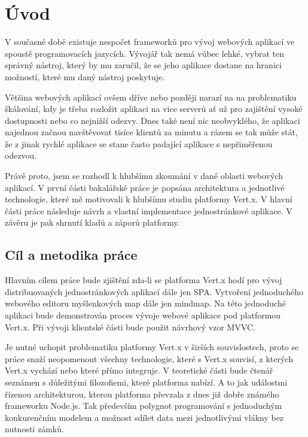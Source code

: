 

\chapter{Úvod}

V současné době existuje nespočet frameworků pro vývoj webových aplikací ve spoustě programovacích jazycích. Vývojář tak nemá vůbec lehké, vybrat ten správný nástroj, který by mu zaručil, že se jeho aplikace dostane na hranici možností, které mu daný nástroj poskytuje. 

Většina webových aplikací ovšem dříve nebo později narazí na na problematiku škálování, kdy je třeba rozložit aplikaci na vice serverů ať už pro zajištění vysoké dostupnosti nebo co nejnižší odezvy. Dnes také není nic neobvyklého, že aplikaci najednou začnou navštěvovat tisíce klientů za minutu a rázem se tak může stát, že z jinak rychlé aplikace se stane často padající aplikace s nepřiměřenou odezvou.

Právě proto, jsem se rozhodl k hlubšímu zkoumání v dané oblasti webových aplikací. V první části bakalářské práce je popsána architektura a jednotlivé technologie, které mě motivovali k hlubšímu studiu platformy Vert.x. V hlavní části práce následuje návrh a vlastní implementace jednostránkové aplikace. V závěru je pak shrnutí kladů a záporů platformy. 

\section{Cíl a metodika práce}

Hlavním cílem práce bude zjištění zda-li se  platforma Vert.x hodí pro vývoj distribuovaných jednostránkových aplikací dále jen SPA. Vytvoření jednoduchého webového editoru myšlenkových map dále jen mindmap. %
Na této jednoduché aplikaci bude demonstrován proces vývoje webové aplikace pod platformou Vert.x. Při vývoji klientské části bude použit návrhový vzor MVVC.

Je nutné uchopit problematiku platformy Vert.x v širších souvislostech, proto se práce snaží neopomenout všechny technologie, které s Vert.x souvisí, z kterých Vert.x vychází nebo které přímo integruje. V teoretické části bude čtenář seznámen s důležitými filozofiemi, které platforma nabízí. A to jak událostmi řízenou architekturou, kterou platforma převzala z dnes již dobře známého frameworku Node.js. Tak především polygnot programování s jednoduchým konkurenčním modelem a možnost sdílet data mezi jednotlivými vlákny bez nutnosti zámků.


